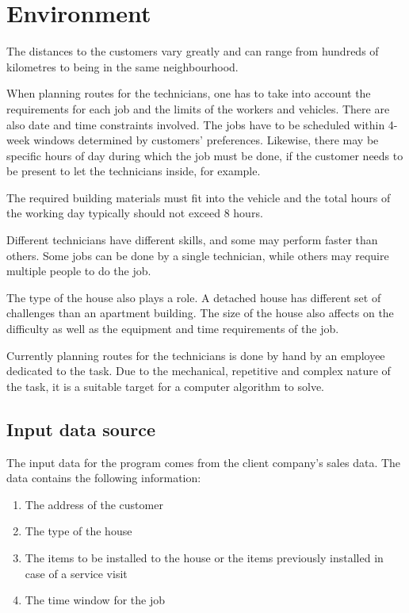 \chapter{Environment}
\label{chapter:environment}



The distances to the customers vary greatly and can range from hundreds of kilometres to being in the same neighbourhood. 

When planning routes for the technicians, one has to take into account the requirements for each job and the limits of the workers and vehicles. There are also date and time constraints involved. The jobs have to be scheduled within 4-week windows determined by customers' preferences. Likewise, there may be specific hours of day during which the job must be done, if the customer needs to be present to let the technicians inside, for example. 

The required building materials must fit into the vehicle and the total hours of the working day typically should not exceed 8 hours. 

Different technicians have different skills, and some may perform faster than others. Some jobs can be done by a single technician, while others may require multiple people to do the job. 


The type of the house also plays a role. A detached house has different set of challenges than an apartment building. The size of the house also affects on the difficulty as well as the equipment and time requirements of the job.

Currently planning routes for the technicians is done by hand by an employee dedicated to the task. Due to the mechanical, repetitive and complex nature of the task, it is a suitable target for a computer algorithm to solve.



\section{Input data source}

The input data for the program comes from the client company's sales data. The data contains the following information:

\begin{enumerate}  
\item The address of the customer
\item The type of the house 
\item The items to be installed to the house or the items previously installed in case of a service visit
\item The time window for the job
\end{enumerate}

